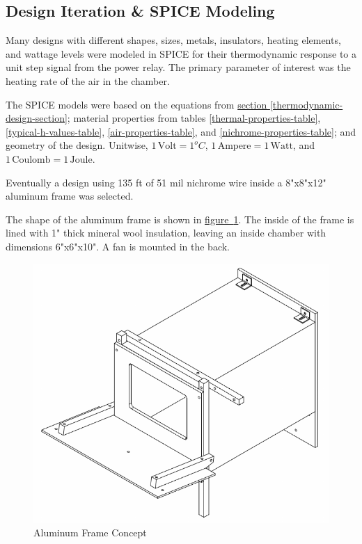 \documentclass[10pt, twocolumn]{article}
\begin{document}
\subsection{Design Iteration \& SPICE Modeling}

Many designs with different shapes, sizes, metals, insulators,
heating elements, and wattage levels were modeled in SPICE for their
thermodynamic response to a unit step signal from the power relay.
The primary parameter of interest was the heating rate of the air
in the chamber.

The SPICE models were based on the equations from
\hyperref[thermodynamic-design-section]{section \ref{thermodynamic-design-section}};
material properties from tables \ref{thermal-properties-table}, \ref{typical-h-values-table},
\ref{air-properties-table}, and \ref{nichrome-properties-table}; and
geometry of the design.
Unitwise, $1\,\textrm{Volt}=1^{o}C$, $1\,\textrm{Ampere}=1\,\textrm{Watt}$,
\mbox{and $1\,\textrm{Coulomb}=1\,\textrm{Joule}$.}

Eventually a design using 135 ft of 51 mil nichrome wire inside a 8"x8"x12"
aluminum frame was selected.

The shape of the aluminum frame is shown in
\mbox{\hyperref[aluminum-frame-concept]{figure \ref{aluminum-frame-concept}}}.
The inside of the frame is lined with 1" thick mineral wool insulation,
leaving an inside chamber with dimensions 6"x6"x10".
A fan is mounted in the back.

\begin{figure}
	\centering
	\includegraphics[width=\columnwidth]{Figures/aluminum-frame-concept.pdf}
	\caption{Aluminum Frame Concept}
	\label{aluminum-frame-concept}
\end{figure}
\end{document}
